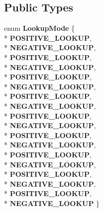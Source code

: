 \subsection*{Public Types}
\begin{DoxyCompactItemize}
\item 
enum {\bfseries Lookup\+Mode} \{ \\*
{\bfseries P\+O\+S\+I\+T\+I\+V\+E\+\_\+\+L\+O\+O\+K\+UP}, 
\\*
{\bfseries N\+E\+G\+A\+T\+I\+V\+E\+\_\+\+L\+O\+O\+K\+UP}, 
\\*
{\bfseries P\+O\+S\+I\+T\+I\+V\+E\+\_\+\+L\+O\+O\+K\+UP}, 
\\*
{\bfseries N\+E\+G\+A\+T\+I\+V\+E\+\_\+\+L\+O\+O\+K\+UP}, 
\\*
{\bfseries P\+O\+S\+I\+T\+I\+V\+E\+\_\+\+L\+O\+O\+K\+UP}, 
\\*
{\bfseries N\+E\+G\+A\+T\+I\+V\+E\+\_\+\+L\+O\+O\+K\+UP}, 
\\*
{\bfseries P\+O\+S\+I\+T\+I\+V\+E\+\_\+\+L\+O\+O\+K\+UP}, 
\\*
{\bfseries N\+E\+G\+A\+T\+I\+V\+E\+\_\+\+L\+O\+O\+K\+UP}, 
\\*
{\bfseries P\+O\+S\+I\+T\+I\+V\+E\+\_\+\+L\+O\+O\+K\+UP}, 
\\*
{\bfseries N\+E\+G\+A\+T\+I\+V\+E\+\_\+\+L\+O\+O\+K\+UP}, 
\\*
{\bfseries P\+O\+S\+I\+T\+I\+V\+E\+\_\+\+L\+O\+O\+K\+UP}, 
\\*
{\bfseries N\+E\+G\+A\+T\+I\+V\+E\+\_\+\+L\+O\+O\+K\+UP}, 
\\*
{\bfseries P\+O\+S\+I\+T\+I\+V\+E\+\_\+\+L\+O\+O\+K\+UP}, 
\\*
{\bfseries N\+E\+G\+A\+T\+I\+V\+E\+\_\+\+L\+O\+O\+K\+UP}, 
\\*
{\bfseries P\+O\+S\+I\+T\+I\+V\+E\+\_\+\+L\+O\+O\+K\+UP}, 
\\*
{\bfseries N\+E\+G\+A\+T\+I\+V\+E\+\_\+\+L\+O\+O\+K\+UP}, 
\\*
{\bfseries P\+O\+S\+I\+T\+I\+V\+E\+\_\+\+L\+O\+O\+K\+UP}, 
\\*
{\bfseries N\+E\+G\+A\+T\+I\+V\+E\+\_\+\+L\+O\+O\+K\+UP}
 \}\hypertarget{classv8_1_1internal_1_1_name_dictionary_lookup_stub_a374c659f56a0459475626d635b65be55}{}\label{classv8_1_1internal_1_1_name_dictionary_lookup_stub_a374c659f56a0459475626d635b65be55}


\end{DoxyCompactItemize}
